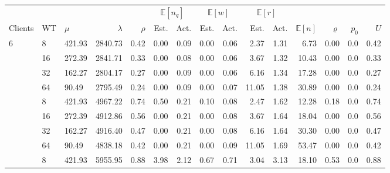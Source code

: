         \begin{table}
            \begin{adjustwidth}{-1cm}{}
                \footnotesize{
                    \begin{tabular}{lllrrrrrrrrrrrr}
                        \toprule
                        & & & & & \multicolumn{2}{c}{$\mathbb{E}[n_q]$} & \multicolumn{2}{c}{$\mathbb{E}[w]$} & \multicolumn{2}{c}{$\mathbb{E}[r]$} & &  & & \\
                        \cmidrule(lr){6-7}
                        \cmidrule(lr){8-9}
                        \cmidrule(lr){10-11}
                        Clients  & WT & $\mu$  & $\lambda$ & $\rho$ & Est.   & Act.   & Est.  & Act.  & Est.  & Act.  & $\mathbb{E}[n]$ & $\varrho$ & $p_0$ & $U$  \\
                        \midrule
                        6        & 8  & 421.93 & 2840.73   & 0.42   & 0.00   & 0.09   & 0.00  & 0.06  & 2.37  & 1.31  & 6.73            & 0.00      & 0.0   & 0.42 \\
                                 & 16 & 272.39 & 2841.71   & 0.33   & 0.00   & 0.08   & 0.00  & 0.06  & 3.67  & 1.32  & 10.43           & 0.00      & 0.0   & 0.33 \\
                                 & 32 & 162.27 & 2804.17   & 0.27   & 0.00   & 0.09   & 0.00  & 0.06  & 6.16  & 1.34  & 17.28           & 0.00      & 0.0   & 0.27 \\
                                 & 64 & 90.49  & 2795.49   & 0.24   & 0.00   & 0.09   & 0.00  & 0.07  & 11.05 & 1.38  & 30.89           & 0.00      & 0.0   & 0.24 \\
                        \addlinespace
                        12       & 8  & 421.93 & 4967.22   & 0.74   & 0.50   & 0.21   & 0.10  & 0.08  & 2.47  & 1.62  & 12.28           & 0.18      & 0.0   & 0.74 \\
                                 & 16 & 272.39 & 4912.86   & 0.56   & 0.00   & 0.21   & 0.00  & 0.08  & 3.67  & 1.64  & 18.04           & 0.00      & 0.0   & 0.56 \\
                                 & 32 & 162.27 & 4916.40   & 0.47   & 0.00   & 0.21   & 0.00  & 0.08  & 6.16  & 1.64  & 30.30           & 0.00      & 0.0   & 0.47 \\
                                 & 64 & 90.49  & 4838.18   & 0.42   & 0.00   & 0.21   & 0.00  & 0.09  & 11.05 & 1.69  & 53.47           & 0.00      & 0.0   & 0.42 \\
                        \addlinespace
                        24       & 8  & 421.93 & 5955.95   & 0.88   & 3.98   & 2.12   & 0.67  & 0.71  & 3.04  & 3.13  & 18.10           & 0.53      & 0.0   & 0.88 \\

\end{tabular}}
\end{adjustwidth}
\end{table}
